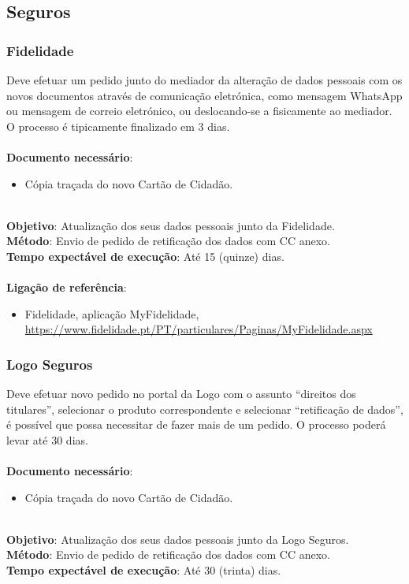 \subsection{Seguros}

\subsubsection{Fidelidade}

Deve efetuar um pedido junto do mediador da alteração de dados pessoais
com os novos documentos através de comunicação eletrónica, como mensagem
WhatsApp ou mensagem de correio eletrónico, ou deslocando-se a
fisicamente ao mediador. O processo é tipicamente finalizado em 3 dias. \\
\\
\textbf{Documento necessário}:
\begin{itemize}
	\item Cópia traçada do novo Cartão de Cidadão.
\end{itemize}
\leavevmode\\
\textbf{Objetivo}: Atualização dos seus dados pessoais junto da Fidelidade. \\ 
\textbf{Método}: Envio de pedido de retificação dos dados com CC anexo. \\
\textbf{Tempo expectável de execução}: Até 15 (quinze) dias. \\
\\
\textbf{Ligação de referência}:
\begin{itemize}
	\item Fidelidade, aplicação MyFidelidade, \url{https://www.fidelidade.pt/PT/particulares/Paginas/MyFidelidade.aspx}
\end{itemize}

\subsubsection{Logo Seguros}

Deve efetuar novo pedido no portal da Logo com o assunto ``direitos dos
titulares'', selecionar o produto correspondente e selecionar
``retificação de dados'', é possível que possa necessitar de fazer mais
de um pedido. O processo poderá levar até 30 dias. \\
\\
\textbf{Documento necessário}:
\begin{itemize}
	\item Cópia traçada do novo Cartão de Cidadão.
\end{itemize}
\leavevmode\\
\textbf{Objetivo}: Atualização dos seus dados pessoais junto da Logo Seguros. \\
\textbf{Método}: Envio de pedido de retificação dos dados com CC anexo. \\
\textbf{Tempo expectável de execução}: Até 30 (trinta) dias.

